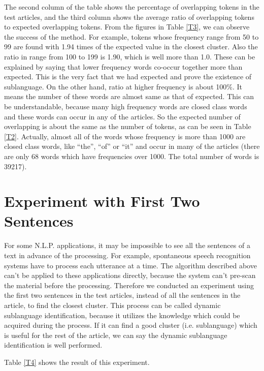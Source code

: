 The second column of the table shows the percentage of overlapping tokens in
the test articles, and the third column shows the
average ratio of overlapping tokens to expected overlapping tokens.
From the figures in Table \ref{T3}, we can observe the success of the method.
For example, tokens whose frequency range from 50 to 99 are found with 1.94 times of
the expected value in the closest cluster.
Also the ratio in range from 100 to 199 is 1.90, which is well more than 1.0.
These can be explained by saying that lower frequency words co-occur together more than expected.
This is the very fact that we had expected and prove the existence of sublanguage.
On the other hand, ratio at higher frequency is about 100\%.
It means the number of these words are almost same as that of expected.
This can be understandable, because many high frequency words are closed class words
and these words can occur in any of the articles.
So the expected number of overlapping is about the same as the number of tokens,
as can be seen in Table \ref{T2}.
Actually, almost all of the words whose frequency is more than 1000
are closed class words, like ``the'', ``of'' or ``it'' and
occur in many of the articles (there are only 68 words
which have frequencies over 1000. The total number of words is 39217).


\section{Experiment with First Two Sentences}

For some N.L.P. applications, it may be impossible to see all the sentences
of a text in advance of the processing.
For example, spontaneous speech recognition systems have to process each
utterance at a time.
The algorithm described above can't be applied to these applications directly,
because the system can't pre-scan the material before the processing.
Therefore we conducted an experiment using the first two sentences in the test articles,
instead of all the sentences in the article, to find the closest cluster.
This process can be called dynamic sublanguage identification,
because it utilizes the knowledge which could be acquired during the process.
If it can find a good cluster (i.e. sublanguage) which is useful for the rest of the article,
we can say the dynamic sublanguage identification is well performed.

Table \ref{T4} shows the result of this experiment.


